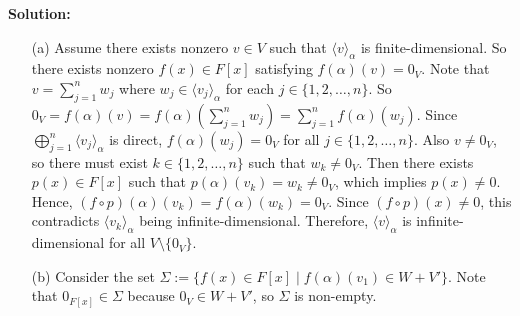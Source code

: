\documentclass[12pt]{article}
\begin{document}
\noindent \textbf{Solution:}
    \begin{enumerate}
        \item[(a)] Assume there exists nonzero $v \in V$ such that $\langle v \rangle_\alpha$ is finite-dimensional. So there exists nonzero $f(x) \in F[x]$ satisfying $f(\alpha)(v) = 0_V$. Note that $v = \sum_{j=1}^n w_j$ where $w_j \in \langle v_j \rangle_\alpha$ for each $j \in \{1,2,\dots,n\}$. So $0_V = f(\alpha)(v) = f(\alpha)\left(\sum_{j=1}^n w_j\right) = \sum_{j=1}^n f(\alpha)(w_j)$. Since $\bigoplus_{j=1}^n \langle v_j \rangle_\alpha$ is direct, $f(\alpha)(w_j) = 0_V$ for all $j \in \{1,2,\dots,n\}$. Also $v \ne 0_V$, so there must exist $k \in  \{1,2,\dots,n\}$ such that $w_k \ne 0_V$. Then there exists $p(x) \in F[x]$ such that $p(\alpha)(v_k) = w_k \ne 0_V$, which implies $p(x) \ne 0$. Hence, $(f \circ p)(\alpha)(v_k) = f(\alpha)(w_k) = 0_V$. Since $(f \circ p)(x) \ne 0$, this contradicts $\langle v_k \rangle_\alpha$ being infinite-dimensional. Therefore, $\langle v \rangle_\alpha$ is infinite-dimensional for all $V \setminus \{0_V\}$.
        \item[(b)] Consider the set $\Sigma := \{f(x) \in F[x] \mid f(\alpha)(v_1) \in W + V'\}$. Note that $0_{F[x]} \in \Sigma$ because $0_V \in W + V'$, so $\Sigma$ is non-empty.


\end{enumerate}
\end{document}
